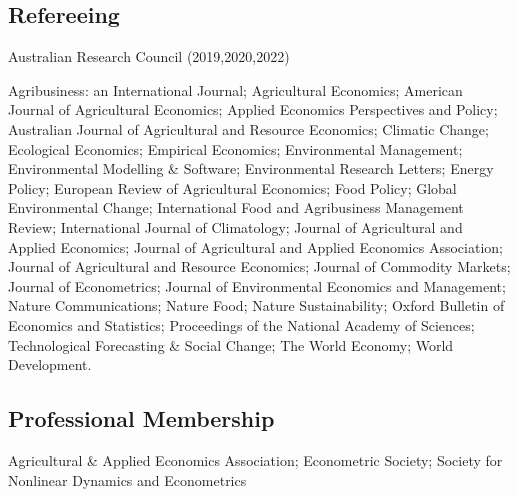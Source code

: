 \documentclass[10pt]{article}
\begin{document}
	\subsection*{Refereeing}
	Australian Research Council (2019,2020,2022)
	
	\medskip
	
	Agribusiness: an International Journal; Agricultural Economics; American Journal of Agricultural Economics; Applied Economics Perspectives and Policy; Australian Journal of Agricultural and Resource Economics; Climatic Change; Ecological Economics; Empirical Economics; Environmental Management; Environmental Modelling \& Software; Environmental Research Letters; Energy Policy; European Review of Agricultural Economics; Food Policy; Global Environmental Change; International Food and Agribusiness Management Review; International Journal of Climatology; Journal of Agricultural and Applied Economics; Journal of Agricultural and Applied Economics Association; Journal of Agricultural and Resource Economics; Journal of Commodity Markets; Journal of Econometrics; Journal of Environmental Economics and Management; Nature Communications; Nature Food; Nature Sustainability; Oxford Bulletin of Economics and Statistics; Proceedings of the National Academy of Sciences; Technological Forecasting \& Social Change; The World Economy; World Development.
	
	\subsection*{Professional Membership}
	Agricultural \& Applied Economics Association; 
		Econometric Society;
	Society for Nonlinear Dynamics and Econometrics
	
	
\end{document}
